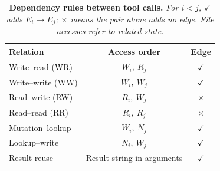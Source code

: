 \begin{table}[!ht]
\centering
\caption{\textbf{Dependency rules between tool calls.}
\small\emph{For $i<j$, $\checkmark$ adds $E_i\rightarrow E_j$;
$\times$ means the pair alone adds no edge. File accesses refer to related state.}}
\label{tab:dependency-rules}
\footnotesize
\setlength{\tabcolsep}{2pt}
\renewcommand{\arraystretch}{1.12}
\begin{tabular*}{\linewidth}{@{\extracolsep{\fill}}lcc@{}}
\toprule
Relation & Access order & Edge \\
\midrule
Write--read (WR) & $W_i,\ R_j$ & $\checkmark$ \\
Write--write (WW) & $W_i,\ W_j$ & $\checkmark$ \\
Read--write (RW) & $R_i,\ W_j$ & $\times$ \\
Read--read (RR) & $R_i,\ R_j$ & $\times$ \\
Mutation--lookup & $W_i,\ N_j$ & $\checkmark$ \\
Lookup--write & $N_i,\ W_j$ & $\checkmark$ \\
\midrule
Result reuse & Result string in arguments & $\checkmark$ \\
\bottomrule
\end{tabular*}
\end{table}

